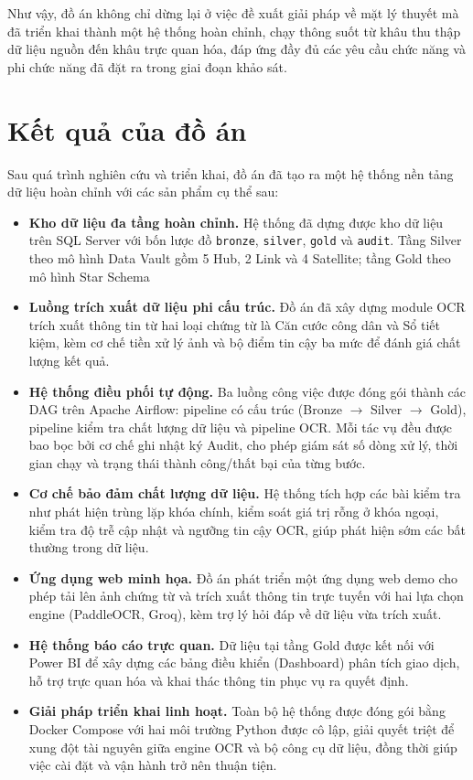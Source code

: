 \documentclass[oneside, a4paper]{book}
\theoremstyle{plain}
\theoremstyle{definition}
\theoremstyle{remark}
\begin{document}
Như vậy, đồ án không chỉ dừng lại ở việc đề xuất giải pháp về mặt lý thuyết mà đã triển khai thành một hệ thống hoàn chỉnh, chạy thông suốt từ khâu thu thập dữ liệu nguồn đến khâu trực quan hóa, đáp ứng đầy đủ các yêu cầu chức năng và phi chức năng đã đặt ra trong giai đoạn khảo sát.
\newpage
\section*{Kết quả của đồ án}

Sau quá trình nghiên cứu và triển khai, đồ án đã tạo ra một hệ thống nền tảng dữ liệu hoàn chỉnh với các sản phẩm cụ thể sau:

\begin{itemize}
    \item \textbf{Kho dữ liệu đa tầng hoàn chỉnh.} Hệ thống đã dựng được kho dữ liệu trên SQL Server với bốn lược đồ \texttt{bronze}, \texttt{silver}, \texttt{gold} và \texttt{audit}. Tầng Silver theo mô hình Data Vault gồm 5 Hub, 2 Link và 4 Satellite; tầng Gold theo mô hình Star Schema 

    \item \textbf{Luồng trích xuất dữ liệu phi cấu trúc.} Đồ án đã xây dựng module OCR trích xuất thông tin từ hai loại chứng từ là Căn cước công dân và Sổ tiết kiệm, kèm cơ chế tiền xử lý ảnh và bộ điểm tin cậy ba mức để đánh giá chất lượng kết quả.

    \item \textbf{Hệ thống điều phối tự động.} Ba luồng công việc được đóng gói thành các DAG trên Apache Airflow: pipeline có cấu trúc (Bronze $\rightarrow$ Silver $\rightarrow$ Gold), pipeline kiểm tra chất lượng dữ liệu và pipeline OCR. Mỗi tác vụ đều được bao bọc bởi cơ chế ghi nhật ký Audit, cho phép giám sát số dòng xử lý, thời gian chạy và trạng thái thành công/thất bại của từng bước.

    \item \textbf{Cơ chế bảo đảm chất lượng dữ liệu.} Hệ thống tích hợp các bài kiểm tra như phát hiện trùng lặp khóa chính, kiểm soát giá trị rỗng ở khóa ngoại, kiểm tra độ trễ cập nhật và ngưỡng tin cậy OCR, giúp phát hiện sớm các bất thường trong dữ liệu.

    \item \textbf{Ứng dụng web minh họa.} Đồ án phát triển một ứng dụng web demo cho phép tải lên ảnh chứng từ và trích xuất thông tin trực tuyến với hai lựa chọn engine (PaddleOCR, Groq), kèm trợ lý hỏi đáp về dữ liệu vừa trích xuất.

    \item \textbf{Hệ thống báo cáo trực quan.} Dữ liệu tại tầng Gold được kết nối với Power BI để xây dựng các bảng điều khiển (Dashboard) phân tích giao dịch, hỗ trợ trực quan hóa và khai thác thông tin phục vụ ra quyết định.

    \item \textbf{Giải pháp triển khai linh hoạt.} Toàn bộ hệ thống được đóng gói bằng Docker Compose với hai môi trường Python được cô lập, giải quyết triệt để xung đột tài nguyên giữa engine OCR và bộ công cụ dữ liệu, đồng thời giúp việc cài đặt và vận hành trở nên thuận tiện.
\end{itemize}
\end{document}
